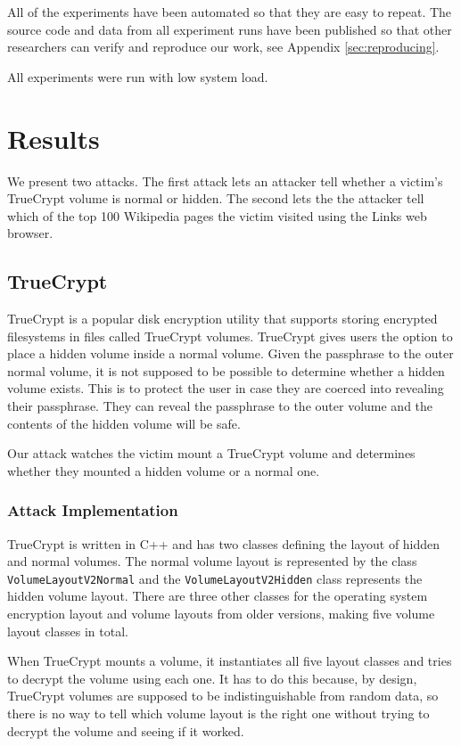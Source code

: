 \documentclass[letterpaper,twocolumn,10pt]{article}
\begin{document}
All of the experiments have been automated so that they are easy to repeat. The
source code and data from all experiment runs have been published so that other
researchers can verify and reproduce our work, see Appendix
\ref{sec:reproducing}.

All experiments were run with low system load.

\section{Results}
\label{sec:results}

We present two attacks. The first attack lets an attacker tell whether
a victim's TrueCrypt volume is normal or hidden. The second lets the the
attacker tell which of the top 100 Wikipedia pages the victim visited using the
Links web browser.

\subsection{TrueCrypt}

TrueCrypt is a popular disk encryption utility that supports storing encrypted
filesystems in files called TrueCrypt volumes. TrueCrypt gives users the option
to place a hidden volume inside a normal volume. Given the passphrase to the
outer normal volume, it is not supposed to be possible to determine whether
a hidden volume exists. This is to protect the user in case they are coerced
into revealing their passphrase. They can reveal the passphrase to the outer
volume and the contents of the hidden volume will be safe. 

Our attack watches the victim mount a TrueCrypt volume and determines whether
they mounted a hidden volume or a normal one.

\subsubsection{Attack Implementation}

TrueCrypt is written in C++ and has two classes defining the layout of hidden
and normal volumes. The normal volume layout is represented by the class
\texttt{VolumeLayoutV2Normal} and the \texttt{VolumeLayoutV2Hidden} class
represents the hidden volume layout. There are three other classes for the
operating system encryption layout and volume layouts from older versions,
making five volume layout classes in total.

When TrueCrypt mounts a volume, it instantiates all five layout classes and
tries to decrypt the volume using each one. It has to do this because, by
design, TrueCrypt volumes are supposed to be indistinguishable from random data,
so there is no way to tell which volume layout is the right one without trying
to decrypt the volume and seeing if it worked.
\end{document}
